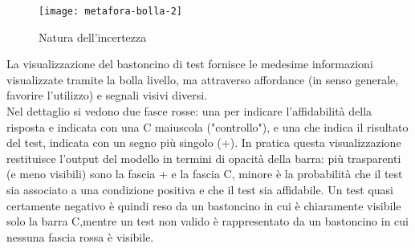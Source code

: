 \begin{figure}[!ht] 
    \centering 
    \texttt{[image: metafora-bolla-2]} 
    \caption{Natura dell'incertezza}
\end{figure}

La visualizzazione del bastoncino di test fornisce le medesime informazioni visualizzate tramite la bolla livello, ma attraverso affordance (in senso generale, favorire l'utilizzo) e segnali visivi diversi.\\
Nel dettaglio si vedono due fasce rosse: una per indicare l'affidabilità della risposta e indicata con una C maiuscola ("controllo"), e una che indica il risultato del test, indicata con un segno più singolo (+). In pratica questa visualizzazione restituisce l'output del modello in termini di opacità della barra: più trasparenti (e meno visibili) sono la fascia + e la fascia C, minore è la probabilità che il test sia associato a una condizione positiva e che il test sia affidabile. Un test quasi certamente negativo è quindi reso da un bastoncino in cui è chiaramente visibile solo la barra C,mentre un test non valido è rappresentato da un bastoncino in cui nessuna fascia rossa è  visibile.